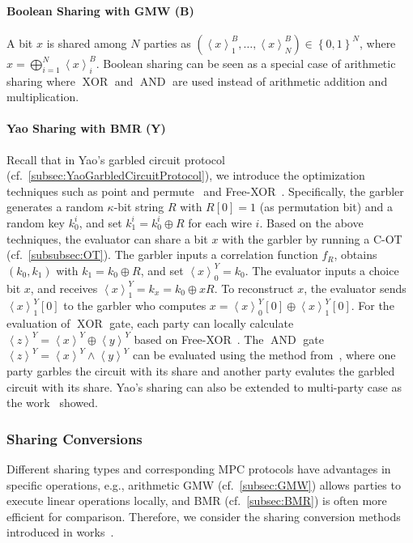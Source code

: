 \paragraph{Boolean Sharing with GMW (B)}
\label{para:BooleanSharing}
A bit $x$ is shared among $N$ parties as $\left(\left\langle x\right\rangle ^B_1, \ldots,\left\langle x\right\rangle ^B_N \right) \in \left\{0,1\right\}^N$, where $x=\bigoplus _{i=1}^N \left\langle x\right\rangle ^B_i$. Boolean sharing can be seen as a special case of arithmetic sharing where $\operatorname{XOR}$ and $\operatorname{AND}$ are used instead of arithmetic addition and multiplication.

\paragraph{Yao Sharing with BMR (Y)}
\label{para:YaoSharing}
Recall that in Yao's garbled circuit protocol (cf.~\autoref{subsec:YaoGarbledCircuitProtocol}), we introduce the optimization techniques such as point and permute~\cite{beaver1990round} and Free-XOR~\cite{kolesnikov2008improved}. Specifically, the garbler generates a random $\kappa$-bit string $R$ with $R\left[0\right] =1$ (as permutation bit) and a random key $k_0^i$, and set $k_1^i=k_0^i\oplus R$ for each wire $i$.
Based on the above techniques, the evaluator can share a bit $x$ with the garbler by running a C-OT (cf.~\autoref{subsubsec:OT}). The garbler inputs a correlation function $f_{R }$, obtains $\left(k_0,k_1 \right) $ with $k_1=k_0\oplus R$, and set $\left\langle x\right\rangle^Y_0 =k_0$. The evaluator inputs a choice bit $x$, and receives $\left\langle x\right\rangle^Y_1 =k_x=k_0\oplus x R$. To reconstruct $x$, the evaluator sends $\left\langle x\right\rangle^Y_1\left[0\right] $ to the garbler who computes $x=\left\langle x\right\rangle^Y_0\left[0\right]\oplus \left\langle x\right\rangle^Y_1\left[0\right]$.
For the evaluation of $\operatorname{XOR}$ gate, each party can locally calculate $\left\langle z\right\rangle ^Y=\left\langle x\right\rangle^Y\oplus \left\langle y\right\rangle ^Y $ based on Free-XOR~\cite{kolesnikov2008improved}. The $\operatorname{AND}$ gate $\left\langle z\right\rangle ^Y=\left\langle x\right\rangle^Y \land\left\langle y\right\rangle ^Y $ can be evaluated using the method from~\cite{bellare2013efficient}, where one party garbles the circuit with its share and another party evalutes the garbled circuit with its share.
Yao's sharing can also be extended to multi-party case as the work~\cite{Braun} showed.

\subsubsection{Sharing Conversions}
\label{subsubsec:SharingConversions}
Different sharing types and corresponding MPC protocols have advantages in specific operations, e.g., arithmetic GMW (cf.~\autoref{subsec:GMW}) allows parties to execute linear operations locally, and BMR (cf.~\autoref{subsec:BMR}) is often more efficient for comparison. Therefore, we consider the sharing conversion methods introduced in works~\cite{DSZ15,braun2020motion}.


